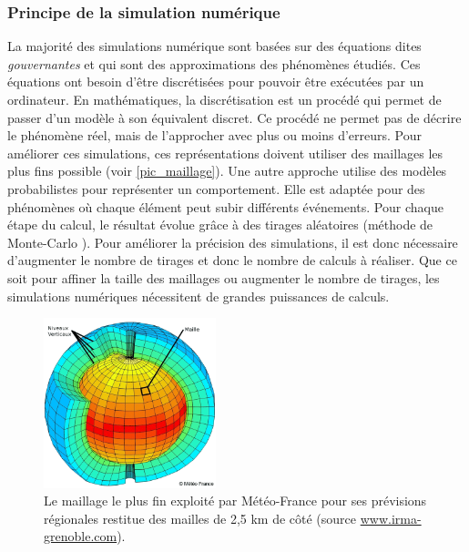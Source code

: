     
     
    \subsubsection{Principe de la simulation numérique}
    
        La majorité des simulations numérique sont basées sur des équations dites \textit{gouvernantes} et qui sont des approximations des phénomènes étudiés. Ces équations ont besoin d'être discrétisées pour pouvoir être exécutées par un ordinateur. En mathématiques, la discrétisation est un procédé qui permet de passer d'un modèle à son équivalent discret. Ce procédé ne permet pas de décrire le phénomène réel, mais de l'approcher avec plus ou moins d'erreurs. Pour améliorer ces simulations, ces représentations doivent utiliser des maillages les plus fins possible (voir \autoref{pic_maillage}). Une autre approche utilise des modèles probabilistes pour représenter un comportement. Elle est adaptée pour des phénomènes où chaque élément peut subir différents événements. Pour chaque étape du calcul, le résultat évolue grâce à des tirages aléatoires (méthode de Monte-Carlo \cite{Kroese2014}). Pour améliorer la précision des simulations, il est donc nécessaire d'augmenter le nombre de tirages et donc le nombre de calculs à réaliser.
        Que ce soit pour affiner la taille des maillages ou augmenter le nombre de tirages, les simulations numériques nécessitent de grandes puissances de calculs. 
            
            \begin{figure}
            \center
            \includegraphics[width=5cm]{images/Chapitre1/maillage.png}
            \caption{\label{pic_maillage} Le maillage le plus fin exploité par Météo-France pour ses prévisions régionales restitue des mailles de 2,5 km de côté (source \url{www.irma-grenoble.com}).}
            \end{figure}

    
